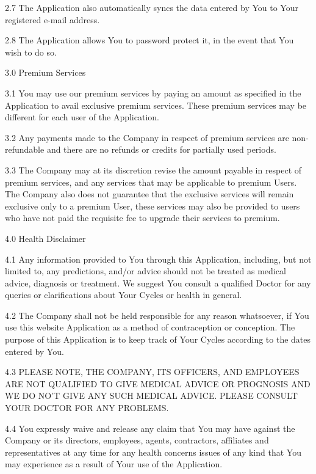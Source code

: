 2.7        The Application also automatically syncs the data entered by You to Your registered e-mail address.

2.8        The Application allows You to password protect it, in the event that You wish to do so.

 

3.0       Premium Services

3.1        You may use our premium services by paying an amount as specified in the Application to avail exclusive premium services. These premium services may be different for each user of the Application.

3.2        Any payments made to the Company in respect of premium services are non-refundable and there are no refunds or credits for partially used periods.

3.3        The Company may at its discretion revise the amount payable in respect of premium services, and any services that may be applicable to premium Users. The Company also does not guarantee that the exclusive services will remain exclusive only to a premium User, these services may also be provided to users who have not paid the requisite fee to upgrade their services to premium.

 

4.0       Health Disclaimer

4.1        Any information provided to You through this Application, including, but not limited to, any predictions, and/or advice should not be treated as medical advice, diagnosis or treatment. We suggest You consult a qualified Doctor for any queries or clarifications about Your Cycles or health in general.

4.2        The Company shall not be held responsible for any reason whatsoever, if You use this website Application as a method of contraception or conception. The purpose of this Application is to keep track of Your Cycles according to the dates entered by You.

4.3        PLEASE NOTE, THE COMPANY, ITS OFFICERS, AND EMPLOYEES ARE NOT QUALIFIED TO GIVE MEDICAL ADVICE OR PROGNOSIS AND WE DO NO’T GIVE ANY SUCH MEDICAL ADVICE. PLEASE CONSULT YOUR DOCTOR FOR ANY PROBLEMS.

4.4        You expressly waive and release any claim that You may have against the Company or its directors, employees, agents, contractors, affiliates and representatives at any time for any health concerns issues of any kind that You may experience as a result of Your use of the Application.

